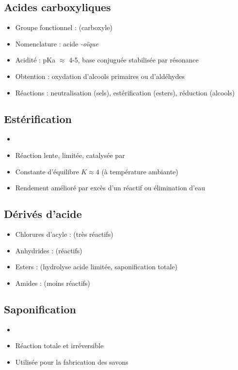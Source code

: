 \begin{synthese}
\subsection*{Acides carboxyliques}
\begin{itemize}
    \item Groupe fonctionnel :  (carboxyle)
    \item Nomenclature : acide \textit{-oïque}
    \item Acidité : pKa $\approx$ 4-5, base conjuguée stabilisée par résonance
    \item Obtention : oxydation d'alcools primaires ou d'aldéhydes
    \item Réactions : neutralisation (sels), estérification (esters), réduction (alcools)
\end{itemize}

\subsection*{Estérification}
\begin{itemize}
    \item {}
    \item Réaction lente, limitée, catalysée par 
    \item Constante d'équilibre $K \approx 4$ (à température ambiante)
    \item Rendement amélioré par excès d'un réactif ou élimination d'eau
\end{itemize}

\subsection*{Dérivés d'acide}
\begin{itemize}
    \item Chlorures d'acyle :  (très réactifs)
    \item Anhydrides :  (réactifs)
    \item Esters :  (hydrolyse acide limitée, saponification totale)
    \item Amides :  (moins réactifs)
\end{itemize}

\subsection*{Saponification}
\begin{itemize}
    \item {}
    \item Réaction totale et irréversible
    \item Utilisée pour la fabrication des savons
\end{itemize}


\end{synthese}
